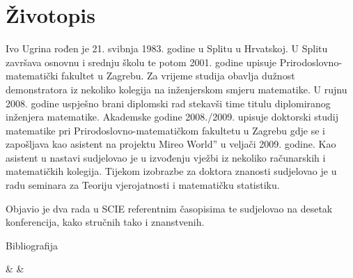 \chapter{Životopis}

Ivo Ugrina rođen je 21. svibnja 1983. godine u Splitu u Hrvatskoj.
U Splitu završava osnovnu i srednju školu te potom 2001. godine
upisuje Prirodoslovno-matematički fakultet u Zagrebu.
Za vrijeme studija obavlja dužnost demonstratora iz nekoliko
kolegija na inženjerskom smjeru matematike. U rujnu 2008. godine
uspješno brani diplomski rad  stekavši time titulu diplomiranog
inženjera matematike. Akademske godine 2008./2009. upisuje
doktorski studij matematike pri Prirodoslovno-matematičkom
fakultetu u Zagrebu gdje se i zapošljava kao asistent na 
projektu {\glqq}Mireo World'' u veljači 2009. godine.
Kao asistent u nastavi sudjelovao je u izvođenju vježbi iz
nekoliko računarskih i matematičkih kolegija. Tijekom
izobrazbe za doktora znanosti sudjelovao je u radu
seminara za Teoriju vjerojatnosti i matematičku statistiku.

Objavio je dva rada u SCIE referentnim časopisima te sudjelovao
na desetak konferencija, kako stručnih tako i znanstvenih.

\vspace{5ex}

\begin{center}
	\LARGE Bibliografija
\end{center}

\begin{easylist}[enumerate]
& 
& 
\end{easylist}


